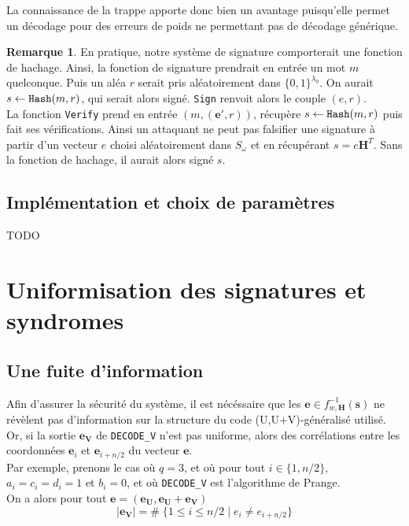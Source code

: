\documentclass[12pt]{article}
\theoremstyle{plain}
\theoremstyle{definition}
\newtheorem{remarque}[thm]{Remarque}
\newcommand{\e}{\mathbf{e}}
\begin{document}
\noindent La connaissance de la trappe apporte donc bien un avantage puisqu'elle permet un décodage pour des erreurs de poids ne permettant pas de décodage générique. 

\begin{remarque} En pratique, notre système de signature comporterait une fonction de hachage. Ainsi, la fonction de signature prendrait en entrée un mot $m$ quelconque. Puis un aléa $r$ serait pris aléatoirement dans $\{0,1\}^{\lambda_0}$. On aurait $s \leftarrow \verb|Hash| (m,r)$, qui serait alors signé. \verb|Sign| renvoit alors le couple $(e,r)$. \\
La fonction \verb|Verify| prend en entrée $(m,(\e',r))$, récupère $s \leftarrow \verb|Hash| (m,r)$ puis fait ses vérifications. Ainsi un attaquant ne peut pas falsifier une signature à partir d'un vecteur $e$ choisi aléatoirement dans $S_{\omega}$ et en récupérant $s = e\mathbf{H}^T$. Sans la fonction de hachage, il aurait alors signé $s$.
\end{remarque}

\subsection{Implémentation et choix de paramètres}
TODO \\
\section{Uniformisation des signatures et syndromes}

\subsection{Une fuite d'information}
Afin d'assurer la sécurité du système, il est nécéssaire que les $\mathbf{e} \in f_{w,\mathbf{H}}^{-1}(\mathbf{s})$ ne révèlent pas d'information sur la structure du code (U,U+V)-généralisé utilisé. \\
Or, si la sortie $\mathbf{e_V}$ de \verb|DECODE_V| n'est pas uniforme, alors des corrélations entre les coordonnées $\mathbf{e}_i$ et $\mathbf{e}_{i+n/2}$ du vecteur $\mathbf{e}$. \\
Par exemple, prenons le cas où $q=3$, et où pour tout $i \in \{1,n/2\}$, $a_i = c_i = d_i = 1$ et $b_i = 0$, et où \verb|DECODE_V| est l'algorithme de Prange. \\
On a alors pour tout $\mathbf{e} = (\mathbf{e_U},\mathbf{e_U}+\mathbf{e_V})$
$$ |\mathbf{e_V}| = \# \; \{1  \leq i \leq n/2 \;|\; e_i \neq e_{i+n/2}\}$$
\end{document}
